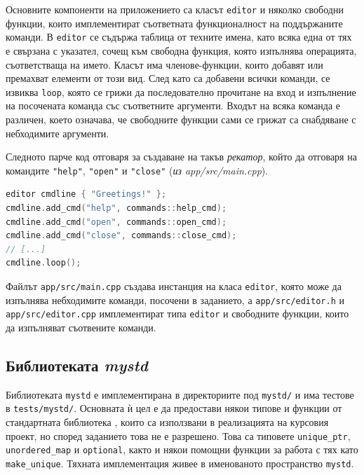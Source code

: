 \documentclass[10pt]{article}
\begin{document}
\par
Основните компоненти на приложението са класът \verb|editor| и няколко свободни функции, които имплементират съответната функционалност на поддържаните команди. В \verb|editor| се съдържа таблица от техните имена, като всяка една от тях е свързана с указател, сочещ към свободна функция, която изпълнява операцията, съответстваща на името. 
Класът има членове-функции, които добавят или премахват елементи от този вид. След като са добавени всички команди, се извиква \verb|loop|, която се грижи да последователно прочитане на вход и изпълнение на посочената команда със съответните аргументи. Входът на всяка команда е различен, което означава, че свободните функции сами се грижат са снабдяване с небходимите аргументи.

\par
Следното парче код отговаря за създаване на такъв \textit{рекатор}, който да отговаря на командите \verb|"help"|, \verb|"open"| и \verb|"close"| (\textit{из app/src/main.cpp}).

\begin{lstlisting}[language=C++]
editor cmdline { "Greetings!" };
cmdline.add_cmd("help", commands::help_cmd);
cmdline.add_cmd("open", commands::open_cmd);
cmdline.add_cmd("close", commands::close_cmd);
// [...]
cmdline.loop();
\end{lstlisting}

\par
Файлът \verb|app/src/main.cpp| създава инстанция на класа \verb|editor|, която може да изпълнява небходимите команди, посочени в заданието, а \verb|app/src/editor.h| и \verb|app/src/editor.cpp| имплементират типа \verb|editor| и свободните функции, които да изпълняват съотвените команди.

\subsection{Библиотеката \textit{mystd}}

\par
Библиотеката \verb|mystd| е имплементирана в директориите под \verb|mystd/| и има тестове в \verb|tests/mystd/|.
Основната ѝ цел е да предостави някои типове и функции от стандартната библиотека \autocite{stl}, които са използвани в реализацията на курсовия проект, но според заданието това не е разрешено. Това са типовете \verb|unique_ptr|, \verb|unordered_map| и \verb|optional|, както и някои помощни функции за работа с тях като \verb|make_unique|. Тяхната имплементация живее в именованото пространство \verb|mystd|.
\end{document}
